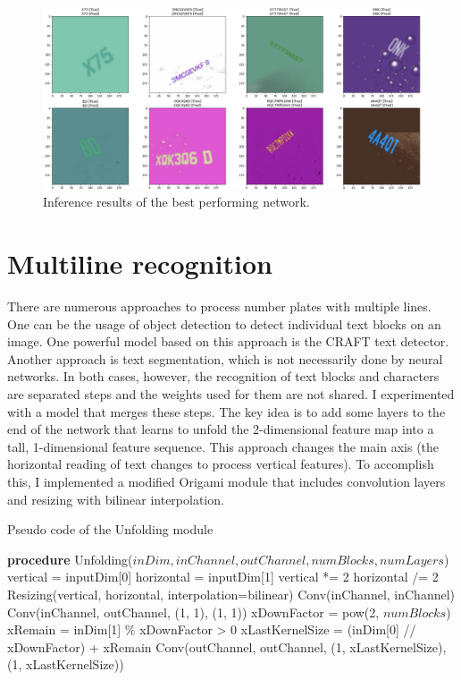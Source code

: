 \begin{figure}[htb]
 \centerline{\includegraphics[width=.85\columnwidth]{.//Figure/OCR/inference.png}}
 \caption{Inference results of the best performing network.}
 \label{fig:simple}
\end{figure}

\section{Multiline recognition}

There are numerous approaches to process number plates with multiple lines. One can be the usage of object detection to detect individual text blocks on an image. One powerful model based on this approach is the CRAFT\cite{CRAFT} text detector. Another approach is text segmentation, which is not necessarily done by neural networks. In both cases, however, the recognition of text blocks and characters are separated steps and the weights used for them are not shared. I experimented with a model that merges these steps. The key idea is to add some layers to the end of the network that learns to unfold the 2-dimensional feature map into a tall, 1-dimensional feature sequence. This approach changes the main axis (the horizontal reading of text changes to process vertical features). To accomplish this, I implemented a modified Origami\cite{OrigamiNet} module that includes convolution layers and resizing with bilinear interpolation.

 \begin{algorithm}
     \caption{Pseudo code of the Unfolding module}
 \begin{algorithmic}[1]
  \label{alg:alg}
    \STATE \textbf{procedure} Unfolding($inDim, inChannel, outChannel, numBlocks, numLayers$)
    \STATE vertical = inputDim[0]
    \STATE horizontal = inputDim[1]
    \STATE vertical *= 2
    \STATE horizontal /= 2
    \STATE Resizing(vertical, horizontal, interpolation=bilinear)
    \STATE Conv(inChannel, inChannel)
    \ENDFOR
    \ENDFOR
    \STATE Conv(inChannel, outChannel, (1, 1), (1, 1))
    \STATE xDownFactor = pow(2, $numBlocks$)
    \STATE xRemain = inDim[1] \% xDownFactor > 0
    \STATE xLastKernelSize = (inDim[0] // xDownFactor) + xRemain
    \STATE Conv(outChannel, outChannel, (1, xLastKernelSize), (1, xLastKernelSize))
\end{algorithmic}
\end{algorithm}

